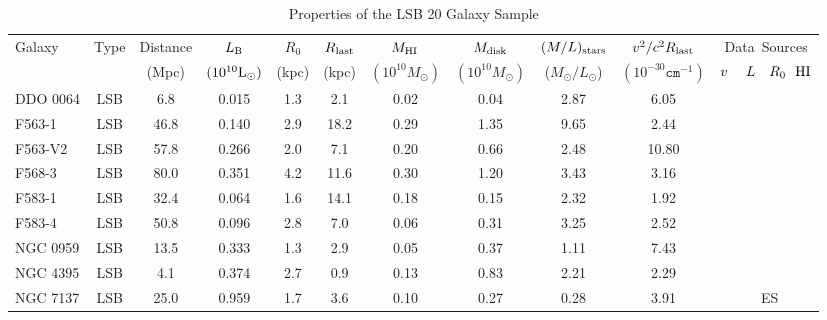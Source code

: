 \documentclass[preprint,aps]{revtex4}
\begin{document}
\begin{table}
\caption{Properties of the LSB 20 Galaxy Sample}
\centering
\begin{tabular}{l c c c c c c c c c c} 
\hline\hline
\phantom{00}Galaxy  & \phantom{0}Type \phantom{0}&Distance  & $L_{\rm  B}$ & $R_0$  & $R_{\rm last} $ &  $M_{\rm HI} $ & $M_{\rm disk}$ &  $ 
(M/L) _{\rm stars}$ & $v^2 / c^2 R_{\rm last}$ & Data~Sources \\  
& &  (Mpc)  &  $(10^{10}{\rm L}_{\odot})$&(kpc) & (kpc) & {$(10^{10} M_\odot)$} & {$(10^{10}
M_\odot)$} & ({$M_{\odot}/L_{\odot}$}) & {$(10^{-30}\texttt{cm}^{-1})$} & $v~~~~L~~~R_0~~{\rm HI}$\\
\hline
DDO 0064 &LSB &\phantom{0}6.8 &  0.015    & 1.3 & \phantom{0}2.1 & 0.02 & 0.04 & \phantom{0}2.87 &\phantom{0}6.05 &    \cite{Kuzio2008} \cite{deBlok2002} \cite{deBlok2002} \cite{Stil2002}  
\\
F563-1 &LSB &46.8 &   0.140  &2.9 & 18.2 & 0.29 & 1.35 & \phantom{0}9.65 & \phantom{0}2.44 &  \cite{Kuzio2006} \cite{deBlok1997} \cite{deBlok1997} \cite{deBlok1996}     
\\
F563-V2 &LSB & 57.8 &    0.266  & 2.0 &\phantom{0}7.1 & 0.20 & 0.66 & \phantom{0}2.48 & 10.80 &    \cite{Kuzio2006} \cite{deBlok1997} \cite{deBlok1997} \cite{deBlok1996}    
\\
F568-3 & LSB& 80.0 &   0.351   & 4.2 & 11.6 & 0.30 & 1.20 & \phantom{0}3.43 & \phantom{0}3.16 &    \cite{Kuzio2006} \cite{deBlok1997} \cite{deBlok1997} \cite{deBlok1996}   
 \\
F583-1 & LSB & 32.4 &  0.064    & 1.6 &  14.1 &0.18 &   0.15 & \phantom{0}2.32 & \phantom{0}1.92&  \cite{Kuzio2008} \cite{deBlok1997} \cite{deBlok1997} \cite{deBlok1996}      
 \\
F583-4 & LSB &50.8 &   0.096   & 2.8 & \phantom{0}7.0 & 0.06 & 0.31 & \phantom{0}3.25 & \phantom{0}2.52 &   \cite{Kuzio2006}  \cite{deBlok1997} \cite{deBlok1997} \cite{deBlok1996}    
\\
NGC 0959 & LSB & 13.5 & 0.333    & 1.3& \phantom{0}2.9 &   0.05 & 0.37 &\phantom{0}1.11&\phantom{0}7.43 &   \cite{Kuzio2008}  \cite{Fisher1981} \cite{Esipov1991}   \cite{Fisher1981} 
\\
NGC 4395 &LSB & \phantom{0}4.1 &0.374&2.7& \phantom{0}0.9 &   0.13 &0.83 &\phantom{0}2.21 &\phantom{0}2.29&\cite{Kuzio2006} \cite{Swaters2002a} \cite{deBlok2002} \cite{Swaters2002a}     
\\
NGC 7137 &LSB & 25.0 &  0.959    & 1.7 & \phantom{0}3.6 & 0.10 & 0.27 & \phantom{0}0.28 & \phantom{0}3.91 &   \cite{Kuzio2008}  \cite{Bieging1977} ~ES \cite{Bieging1977}  

\end{tabular}
\end{table}
\end{document}
